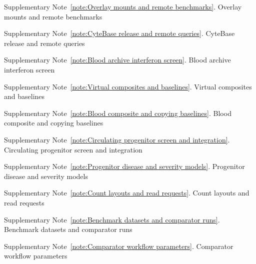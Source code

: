 \documentclass[11pt]{article}
\begin{document}
{\sffamily\color{ink}
\par\vspace{0.3em}
\vspace{0.5em}
\par}
\vspace{0.6em}\noindent{\color{rulegrey}\rule{\textwidth}{0.45pt}}
\vspace{0.35em}

{
\par
{\small
\begin{list}{\textbullet}{\setlength{\topsep}{2pt}\setlength{\itemsep}{0pt}\setlength{\parsep}{0pt}%
  \setlength{\leftmargin}{1.1em}\setlength{\labelwidth}{0.7em}\setlength{\labelsep}{0.4em}}
  \item Supplementary Note~\ref{note:Overlay mounts and remote benchmarks}. Overlay mounts and remote benchmarks
  \item Supplementary Note~\ref{note:CyteBase release and remote queries}. CyteBase release and remote queries
  \item Supplementary Note~\ref{note:Blood archive interferon screen}. Blood archive interferon screen
  \item Supplementary Note~\ref{note:Virtual composites and baselines}. Virtual composites and baselines
  \item Supplementary Note~\ref{note:Blood composite and copying baselines}. Blood composite and copying baselines
  \item Supplementary Note~\ref{note:Circulating progenitor screen and integration}. Circulating progenitor screen and integration
  \item Supplementary Note~\ref{note:Progenitor disease and severity models}. Progenitor disease and severity models
  \item Supplementary Note~\ref{note:Count layouts and read requests}. Count layouts and read requests
  \item Supplementary Note~\ref{note:Benchmark datasets and comparator runs}. Benchmark datasets and comparator runs
  \item Supplementary Note~\ref{note:Comparator workflow parameters}. Comparator workflow parameters

\end{list}}}
\end{document}
